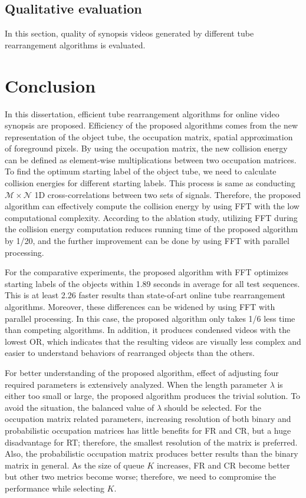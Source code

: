 \documentclass[11pt]{hyu_thesis}
\begin{document}
\section{Qualitative evaluation}
In this section, quality of synopsis videos generated by different tube rearrangement algorithms is evaluated.

\chapter{Conclusion}
\label{sec:conc}
In this dissertation, efficient tube rearrangement algorithms for online video synopsis are proposed. Efficiency of the proposed algorithms comes from the new representation of the object tube, the occupation matrix, spatial approximation of foreground pixels. By using the occupation matrix, the new collision energy can be defined as element-wise multiplications between two occupation matrices. To find the optimum starting label of the object tube, we need to calculate collision energies for different starting labels. This process is same as conducting $\mathcal{M}\times\mathcal{N}$ 1D cross-correlations between two sets of signals. Therefore, the proposed algorithm can effectively compute the collision energy by using FFT with the low computational complexity. According to the ablation study, utilizing FFT during the collision energy computation reduces running time of the proposed algorithm by 1/20, and the further improvement can be done by using FFT with parallel processing.

For the comparative experiments, the proposed algorithm with FFT optimizes starting labels of the objects within 1.89 seconds in average for all test sequences. This is at least 2.26 faster results than state-of-art online tube rearrangement algorithms. Moreover, these differences can be widened by using FFT with parallel processing. In this case, the proposed algorithm only takes 1/6 less time than competing algorithms. In addition, it produces condensed videos with the lowest OR, which indicates that the resulting videos are visually less complex and easier to understand behaviors of rearranged objects than the others.

For better understanding of the proposed algorithm, effect of adjusting four required parameters is extensively analyzed. When the length parameter $\lambda$ is either too small or large, the proposed algorithm produces the trivial solution. To avoid the situation, the balanced value of $\lambda$ should be selected. For the occupation matrix related parameters, increasing resolution of both binary and probabilistic occupation matrices has little benefits for FR and CR, but a huge disadvantage for RT; therefore, the smallest resolution of the matrix is preferred. Also, the probabilistic occupation matrix produces better results than the binary matrix in general. As the size of queue $K$ increases, FR and CR become better but other two metrics become worse; therefore, we need to compromise the performance while selecting $K$.
\end{document}
